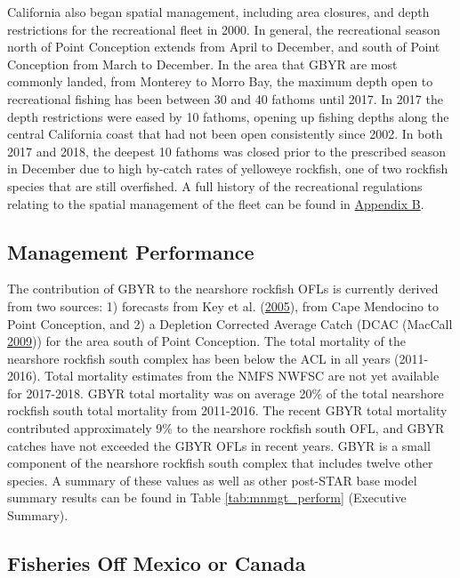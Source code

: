 \documentclass[12pt,]{article}
\begin{document}
California also began spatial management, including area closures, and
depth restrictions for the recreational fleet in 2000. In general, the
recreational season north of Point Conception extends from April to
December, and south of Point Conception from March to December. In the
area that GBYR are most commonly landed, from Monterey to Morro Bay, the
maximum depth open to recreational fishing has been between 30 and 40
fathoms until 2017. In 2017 the depth restrictions were eased by 10
fathoms, opening up fishing depths along the central California coast
that had not been open consistently since 2002. In both 2017 and 2018,
the deepest 10 fathoms was closed prior to the prescribed season in
December due to high by-catch rates of yelloweye rockfish, one of two
rockfish species that are still overfished. A full history of the
recreational regulations relating to the spatial management of the fleet
can be found in
\protect\hyperlink{appendix-b.-californias-recreational-fishery-regulations}{Appendix
B}.

\subsection{Management Performance}\label{management-performance-1}

The contribution of GBYR to the nearshore rockfish OFLs is currently
derived from two sources: 1) forecasts from Key et al.
(\protect\hyperlink{ref-Key2005}{2005}), from Cape Mendocino to Point
Conception, and 2) a Depletion Corrected Average Catch (DCAC (MacCall
\protect\hyperlink{ref-MacCall2009}{2009})) for the area south of Point
Conception. The total mortality of the nearshore rockfish south complex
has been below the ACL in all years (2011-2016). Total mortality
estimates from the NMFS NWFSC are not yet available for 2017-2018. GBYR
total mortality was on average 20\% of the total nearshore rockfish
south total mortality from 2011-2016. The recent GBYR total mortality
contributed approximately 9\% to the nearshore rockfish south OFL, and
GBYR catches have not exceeded the GBYR OFLs in recent years. GBYR is a
small component of the nearshore rockfish south complex that includes
twelve other species. A summary of these values as well as other
post-STAR base model summary results can be found in Table
\ref{tab:mnmgt_perform} (Executive Summary).

\subsection{Fisheries Off Mexico or
Canada}\label{fisheries-off-mexico-or-canada}
\end{document}
